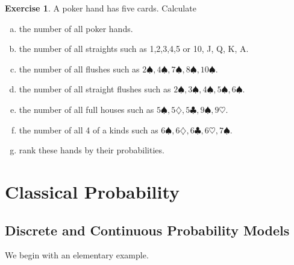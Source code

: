 \documentclass[12pt]{amsart}
\theoremstyle{definition}
\newtheorem{exercise}[theorem]{Exercise}
\begin{document}
\begin{exercise} A poker hand has five cards. Calculate
\begin{enumerate}[a.]
\item the number of all poker hands.
\item the number of all straights such as 1,2,3,4,5 or 10, J, Q, K, A.
\item the number of all flushes such as $2\spadesuit, 4\spadesuit, 7\spadesuit, 8\spadesuit, 10\spadesuit$.
\item the number of all straight flushes such as $2\spadesuit, 3\spadesuit, 4\spadesuit, 5\spadesuit, 6\spadesuit$.
\item the number of all full houses such as $5\spadesuit, 5\diamondsuit, 5\clubsuit, 9\spadesuit, 9\heartsuit$.
\item the number of all 4 of a kinds such as $6\spadesuit, 6\diamondsuit, 6\clubsuit, 6\heartsuit, 7\spadesuit$.
\item rank these hands by their probabilities. 
\end{enumerate}
\end{exercise}

\section{Classical Probability} \label{probabilitymodel}

\subsection{Discrete and Continuous Probability Models} \label{classical_probability} We begin with an elementary example.
\end{document}
